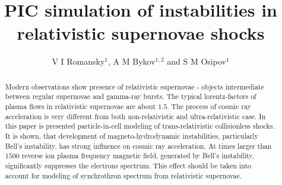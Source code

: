 \documentclass[a4paper]{jpconf}
\begin{document}
	\title{PIC simulation of instabilities in relativistic supernovae shocks}
	
	\author{V I Romansky$^{1}$, A M Bykov$^{1,2}$ and S M Osipov$^{1}$}
	
	\address{$^1$ Ioffe Institute, 26 Politekhnicheskaya st., St. Petersburg 194021, Russia}
	\address{$^2$ Peter the Great St. Petersburg Polytechnic University, 29 Politekhnicheskaya st., St. Petersburg 195251, Russia}
	
	
	\begin{abstract}
                 Modern observations show presence of relativistic supernovae - objects intermediate between regular supernovae and gamma-ray bursts. The typical lorentz-factors of plasma flows in relativistic supernovae are about $1.5$. The process of cosmic ray acceleration is very different from both non-relativistic and ultra-relativistic case. In this paper is presented particle-in-cell modeling of trans-relativistic collisionless shocks. It is shown, that development of magneto-hydrodynamic instabilities, particularly Bell's instability, has strong influence on cosmic ray acceleration. At times larger than $1500$ reverse ion plasma frequency magnetic field, generated by Bell's instability, significantly suppresses the electrons spectrum. This effect should be taken into account for modeling of synchrothron spectrum from relativistic supernovae.
	\end{abstract}
	
\end{document}
